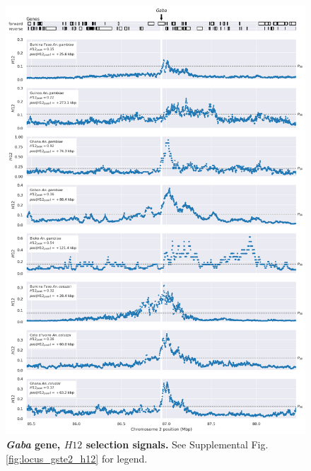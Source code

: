 \documentclass[a4paper,11pt,abstracton,hidelinks]{scrartcl}
\begin{document}
\begin{figure}[t!]
	\begin{center}
		\includegraphics*[width=1\linewidth,center]{artwork/locus_gaba_h12_pdist.png}
	\end{center}
	\caption[\textit{Gaba} gene, $H12$ selection signals]{
	\textbf{\textit{Gaba} gene, $H12$ selection signals.}
	See Supplemental Fig. \ref{fig:locus_gste2_h12} for legend.
	} 
	\label{fig:locus_gaba_h12}
\end{figure}


\clearpage
\end{document}
